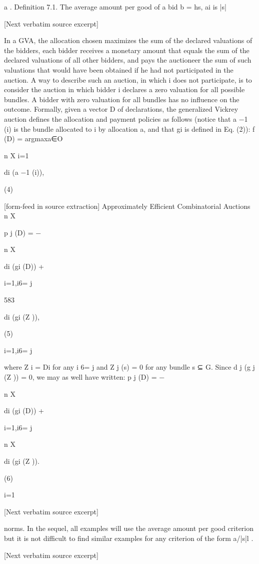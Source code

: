 \documentclass[10pt]{article}
\begin{document}
\begin{ReviewVerbatim}

a
.
Definition 7.1. The average amount per good of a bid b = hs, ai is |s|

[Next verbatim source excerpt]

In a GVA, the allocation chosen maximizes the sum of the declared valuations
of the bidders, each bidder receives a monetary amount that equals the sum of the
declared valuations of all other bidders, and pays the auctioneer the sum of such
valuations that would have been obtained if he had not participated in the auction.
A way to describe such an auction, in which i does not participate, is to consider
the auction in which bidder i declares a zero valuation for all possible bundles. A
bidder with zero valuation for all bundles has no influence on the outcome.
Formally, given a vector D of declarations, the generalized Vickrey auction
defines the allocation and payment policies as follows (notice that a −1 (i) is the
bundle allocated to i by allocation a, and that gi is defined in Eq. (2)):
f (D) = argmaxa∈O

n
X
i=1

di (a −1 (i)),

(4)


[form-feed in source extraction]
Approximately Efficient Combinatorial Auctions
n
X

p j (D) = −

n
X

di (gi (D)) +

i=1,i6= j

583

di (gi (Z )),

(5)

i=1,i6= j

where Z i = Di for any i 6= j and Z j (s) = 0 for any bundle s ⊆ G. Since
d j (g j (Z )) = 0, we may as well have written:
p j (D) = −

n
X

di (gi (D)) +

i=1,i6= j

n
X

di (gi (Z )).

(6)

i=1

[Next verbatim source excerpt]

norms. In the sequel, all examples will use the average amount per good criterion
but it is not difficult to find similar examples for any criterion of the form a/|s|l .

[Next verbatim source excerpt]


\end{ReviewVerbatim}
\end{document}
